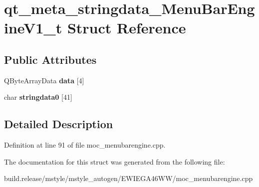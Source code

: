 \hypertarget{structqt__meta__stringdata___menu_bar_engine_v1__t}{}\section{qt\+\_\+meta\+\_\+stringdata\+\_\+\+Menu\+Bar\+Engine\+V1\+\_\+t Struct Reference}
\label{structqt__meta__stringdata___menu_bar_engine_v1__t}
\subsection*{Public Attributes}
\begin{DoxyCompactItemize}
\item 
\mbox{\label{structqt__meta__stringdata___menu_bar_engine_v1__t_a388dbfef78a9e5dee7409c6d438de15f}} 
Q\+Byte\+Array\+Data {\bfseries data} \mbox{[}4\mbox{]}
\item 
\mbox{\label{structqt__meta__stringdata___menu_bar_engine_v1__t_acf257c2e626278000147b7b65a185cdf}} 
char {\bfseries stringdata0} \mbox{[}41\mbox{]}
\end{DoxyCompactItemize}


\subsection{Detailed Description}


Definition at line 91 of file moc\+\_\+menubarengine.\+cpp.



The documentation for this struct was generated from the following file\+:\begin{DoxyCompactItemize}
\item 
build.\+release/mstyle/mstyle\+\_\+autogen/\+E\+W\+I\+E\+G\+A46\+W\+W/moc\+\_\+menubarengine.\+cpp\end{DoxyCompactItemize}
